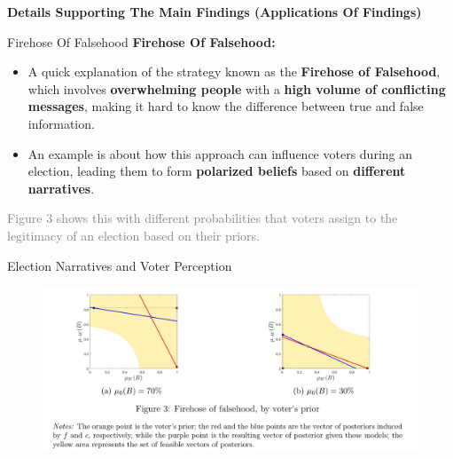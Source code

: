 \documentclass[aspectratio=169]{beamer}
\theoremstyle{definition}
\theoremstyle{plain}
\theoremstyle{plain}
\theoremstyle{definition}
\theoremstyle{plain}
\theoremstyle{plain}
\theoremstyle{plain}
\theoremstyle{plain}
\theoremstyle{remark}
\theoremstyle{definition}
\begin{document}
\begin{frame}
  \vfill
  \centering
  \textbf{Details Supporting The Main Findings (Applications Of Findings)}
  \vfill
\end{frame}


\begin{frame}{Firehose Of Falsehood}
  \textbf{Firehose Of Falsehood:} \\
  \vspace{0.3cm} %
  \begin{itemize}
    \item A quick explanation of the strategy known as the \textbf{Firehose of Falsehood}, which involves \textbf{overwhelming people} with a \textbf{high volume of conflicting messages}, making it hard to know the difference between true and false information.
  \end{itemize}
  \vspace{0.3cm}
  \begin{itemize}
    \item An example is about how this approach can influence voters during an election, leading them to form \textbf{polarized beliefs} based on \textbf{different narratives}.
  \end{itemize}
  \vspace{0.3cm} %
  \textcolor{gray}{\small Figure 3 shows this with different probabilities that voters assign to the legitimacy of an election based on their priors.}
\end{frame}


\begin{frame}{Election Narratives and Voter Perception}
  \begin{figure}
      \centering
      \includegraphics[width=1\linewidth]{image.png}
      \label{fig:enter-label}
  \end{figure}
\end{frame}
\end{document}
